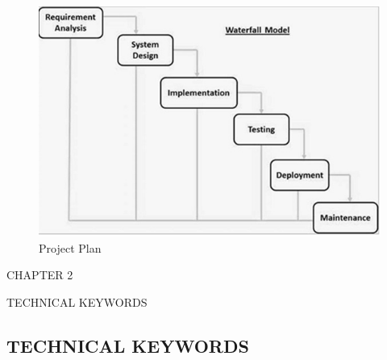 \documentclass[12pt,a4paper]
{article}
\numberwithin{table}{section}
\begin{document}
{{ \begin{figure}[h]
\centering
\includegraphics[width=15cm , height=10 cm]{img.PNG}
\caption{Project Plan} 
\label{fig: Project Plan}
\end{figure}

  
  
  
  
  
  
\newpage
\begin{minipage}{15 cm}


\begin{center} 
\begin{Huge}
\vspace{4 in}
CHAPTER 2

\vspace{0.2 in}
TECHNICAL KEYWORDS

\end{Huge}

\end{center}
\end{minipage}

\newpage
\begin{center}
\section{TECHNICAL KEYWORDS}
\end{center}
 {\setlength{\baselineskip}{1.0\baselineskip} 		
  \vspace{0.1in}					



}}}
\end{document}
